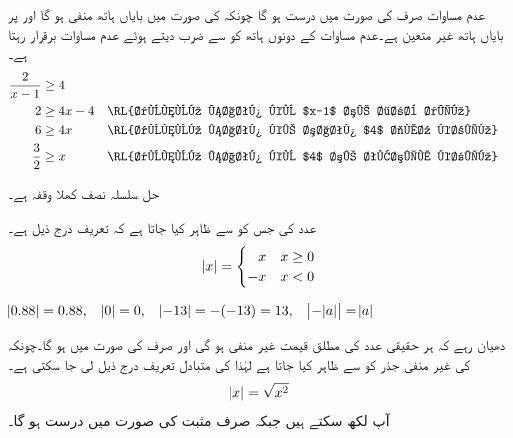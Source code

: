 \begin{enumerate}[1)]
عدم مساوات  صرف  کی صورت میں درست ہو گا چونکہ  کی صورت میں بایاں ہاتھ منفی ہو گا اور  پر بایاں ہاتھ غیر متعین ہے۔عدم مساوات کے دونوں ہاتھ کو  سے ضرب دیتے ہوئے عدم مساوات برقرار رہتا ہے۔
\begin{align*}
\frac{2}{x-1}&\ge 4\\
2&\ge 4x-4&&\text{\RL{دونوں ہاتھ کو $x-1$ سے ضرب دیں}}\\
6&\ge 4x&&\text{\RL{دونوں ہاتھ کے ساتھ $4$ جمع کریں}}\\
\frac{3}{2}&\ge x&&\text{\RL{دونوں ہاتھ کو $4$ سے تقسیم کریں}}
\end{align*}
%
\begin{center}
\end{center}
حل سلسلہ نصف کھلا وقفہ \عددی{(1,\tfrac{3}{2}]} ہے۔
\end{enumerate}
عدد  کی  جس کو  سے ظاہر کیا جاتا ہے کہ تعریف درج ذیل ہے۔
\begin{align*}
\abs{x}=
\begin{cases}
\phantom{-}x&x\ge 0\\
-x&x<0
\end{cases}
\end{align*}

$\abs{0.88}=0.88,\quad \abs{0}=0,\quad \abs{-13}=-(-13)=13,\quad \abs{-\abs{a}}=\abs{a}$

دھیان رہے کہ ہر حقیقی عدد کی مطلق قیمت غیر منفی  ہو گی اور صرف  کی صورت میں  ہو گا۔چونکہ  کی غیر منفی  جذر کو  سے ظاہر کیا جاتا ہے لہٰذا  کی متبادل تعریف درج ذیل لی جا سکتی ہے۔
\begin{align*}
\abs{x}=\sqrt{x^2}
\end{align*} 
آپ  لکھ سکتے ہیں جبکہ  صرف مثبت  کی صورت میں درست ہو گا۔ 

